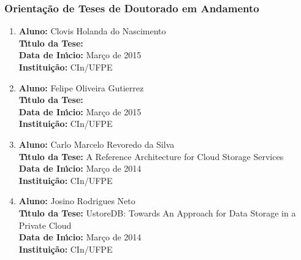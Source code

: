 \documentclass[a4paper,oneside,10pt]{article}
\begin{document}

\subsubsection{Orienta\c{c}\~{a}o de Teses de Doutorado em Andamento}
\vspace{0.3cm}

\begin{enumerate}
\renewcommand{\labelenumi}{{\large\bfseries\arabic{enumi}.}}

\item       \textbf{Aluno:} Clovis Holanda do Nascimento \mbox{} \\
            \textbf{T\'{\i}tulo da Tese:}  \\
            \textbf{Data de In\'{\i}cio:} Mar\c{c}o de 2015 \\
            \textbf{Institui\c{c}\~{a}o:} CIn/UFPE

\item       \textbf{Aluno:} Felipe Oliveira Gutierrez \mbox{}\\
            \textbf{T\'{\i}tulo da Tese:}  \\
            \textbf{Data de In\'{\i}cio:} Mar\c{c}o de 2015 \\
            \textbf{Institui\c{c}\~{a}o:} CIn/UFPE

\item       \textbf{Aluno:} Carlo Marcelo Revoredo da Silva \mbox{}\\
            \textbf{T\'{\i}tulo da Tese:}  A Reference Architecture for Cloud Storage Services\\
            \textbf{Data de In\'{\i}cio:} Mar\c{c}o de 2014 \\
            \textbf{Institui\c{c}\~{a}o:} CIn/UFPE

\item       \textbf{Aluno:} Josino Rodrigues Neto \mbox{} \\
            \textbf{T\'{\i}tulo da Tese:} UstoreDB: Towards An Approach for Data Storage in a Private Cloud \\
            \textbf{Data de In\'{\i}cio:} Mar\c{c}o de 2014 \\
            \textbf{Institui\c{c}\~{a}o:} CIn/UFPE


\end{enumerate}
\end{document}
